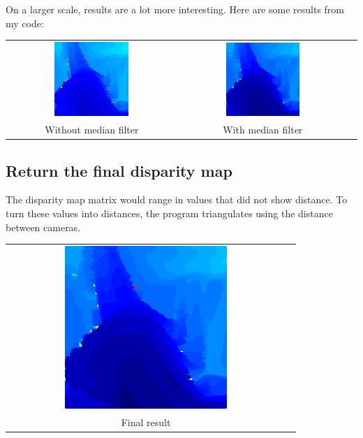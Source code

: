 \documentclass[11pt,fleqn]{article}
\begin{document}
On a larger scale, results are a lot more interesting. Here are some results from my code:\\

\begin{tabular}{ccc}
\includegraphics[width=0.456\textwidth]{images/withoutmedianfilter.png} &
\includegraphics[width=0.456\textwidth]{images/withmedianfilter.png}\\[2pt]
Without median filter & With median filter \\
\end{tabular}

\subsection{Return the final disparity map}

The disparity map matrix would range in values that did not show distance. To turn these values into distances, the program triangulates using the distance between cameras.
\begin{center}
\begin{tabular}{cc}
\includegraphics[width=0.6\textwidth]{images/withmedianfilter.png}\\
Final result
\end{tabular}
\end{center}
\end{document}
